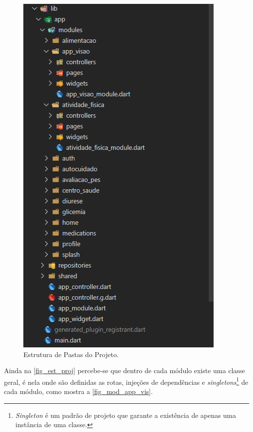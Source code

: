 \begin{figure}[htb]
    \caption{\label{fig_est_proj}Estrutura de Pastas do Projeto.}
    \begin{center}
        \includegraphics[scale=0.75]{Imagens/desenvolvimento/arquitetura_dia_vision.png}
    \end{center}
\end{figure}

Ainda na \autoref{fig_est_proj} percebe-se que dentro de cada módulo existe uma classe geral, é nela onde são definidas
as rotas, injeções de dependências e \emph{singletons}\footnote{\emph{Singleton} é um padrão de projeto que garante
a existência de apenas uma instância de uma classe.} de cada módulo, como mostra a \autoref{fig_mod_app_vis}.

\newpage


